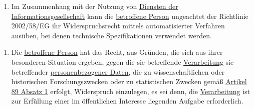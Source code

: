 \begin{commentblock}
\begin{enumerate}[start=5]

  \item 
   Im Zusammenhang mit der Nutzung von \hyperref[itm:04-25]{Diensten der Informationsgesellschaft} kann
   die \hyperref[itm:04-1]{betroffene Person} ungeachtet der Richtlinie 2002/58/EG ihr Widerspruchsrecht mittels
   automatisierter Verfahren ausüben, bei denen technische Spezifikationen verwendet werden.%
  \label{itm:21-5}

\end{enumerate}
\end{commentblock}

\begin{enumerate}[start=6]

  \item Die \hyperref[itm:04-1]{betroffene Person} hat das Recht, aus Gründen, die sich aus ihrer besonderen Situation
   ergeben, gegen die sie betreffende \hyperref[itm:04-2]{Verarbeitung} sie betreffender \hyperref[itm:04-1]
   {personenbezogener Daten}, die zu wissenschaftlichen oder historischen Forschungszwecken oder zu statistischen
   Zwecken gemäß \hyperref[itm:89-1]{Artikel 89 Absatz 1} erfolgt, Widerspruch einzulegen, es sei denn, die \hyperref
   [itm:04-2]{Verarbeitung} ist zur Erfüllung einer im öffentlichen Interesse liegenden Aufgabe erforderlich.%
  \label{itm:21-6}

\end{enumerate}


